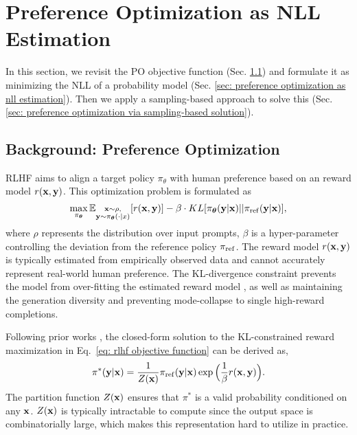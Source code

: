 
\section{Preference Optimization as NLL Estimation}
\label{sec: po as nll estimation}
In this section,
we revisit the PO objective function (Sec. \ref{sec:background preference optimization}) and formulate it as minimizing the NLL of a probability model (Sec. \ref{sec: preference optimization as nll estimation}).
Then we apply a sampling-based approach to solve this (Sec. \ref{sec: preference optimization via sampling-based solution}).

\subsection{Background: Preference Optimization}
\label{sec:background preference optimization}
RLHF aims to align a target policy $\pi_{\theta}$ with human preference based on an reward model $r(\mathbf{x}, \mathbf{y})$.
This optimization problem is formulated as
\begin{equation}
\label{eq: rlhf objective function}
\max \limits_{\pi_{\boldsymbol\theta}}
\mathbb{E}_{\substack{\mathbf{x} \sim \rho,\\ \mathbf{y} \sim \pi_{\boldsymbol\theta}(\cdot|x)}}
[r(\mathbf{x}, \mathbf{y})]
-
\beta \cdot KL[\pi_{\boldsymbol\theta}(\mathbf{y} | \mathbf{x}) || \pi_{\rm ref}(\mathbf{y} | \mathbf{x})],
\end{equation}
where $\rho$ represents the distribution over input prompts, 
$\beta$ is a hyper-parameter controlling the deviation from the reference policy $\pi_{\rm ref}$.
The reward model $r(\mathbf{x}, \mathbf{y})$ is typically estimated from empirically observed data and cannot accurately represent real-world human preference.
The KL-divergence constraint prevents the model from over-fitting the estimated reward model \citep{skalse2022defining},
as well as maintaining the generation diversity and preventing mode-collapse to single high-reward completions.

Following prior works \citep{go2023aligning},
the closed-form solution to the KL-constrained reward maximization in Eq.~\eqref{eq: rlhf objective function} can be derived as,
\begin{equation}
\label{eq: rlhf optimal solution}
\pi^{\ast}(\mathbf{y} | \mathbf{x})
=
\frac{1} {Z(\mathbf{x})}
\pi_{\rm ref}(\mathbf{y} | \mathbf{x}) 
\exp 
\Big(
\frac{1} {\beta} r(\mathbf{x}, \mathbf{y})
\Big).
\end{equation}
The partition function $Z(\mathbf{x})$ ensures that $\pi^{\ast}$ is a valid probability conditioned on any $\mathbf{x}$.
$Z(\mathbf{x})$ is typically intractable to compute since the output space is combinatorially large,
which makes this representation hard to utilize in practice.


